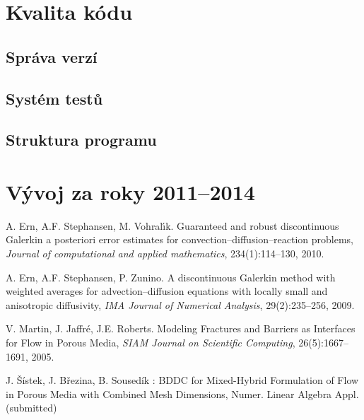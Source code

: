 \documentclass[11pt]{report}
\begin{document}
\section{Kvalita kódu}
\subsection{Správa verzí}
\subsection{Systém testů}
\subsection{Struktura programu}



\section{Vývoj za roky 2011--2014}

\begin{thebibliography}{99}

A. Ern, A.F. Stephansen, M. Vohral{\'\i}k.
Guaranteed and robust discontinuous Galerkin a posteriori error estimates for convection--diffusion--reaction problems,
\emph{Journal of computational and applied mathematics}, 234(1):114--130, 2010.


A. Ern, A.F. Stephansen, P. Zunino.
A discontinuous {G}alerkin method with weighted averages for advection--diffusion equations with locally small and anisotropic diffusivity,
\emph{IMA Journal of Numerical Analysis}, 29(2):235--256, 2009.


V. Martin, J. Jaffr{\'e}, J.E. Roberts.
Modeling Fractures and Barriers as Interfaces for Flow in Porous Media,
\emph{{SIAM} Journal on Scientific Computing}, 26(5):1667--1691, 2005.


J. Šístek, J. Březina, B. Sousedík : BDDC for Mixed-Hybrid 
Formulation of Flow in Porous Media with Combined Mesh Dimensions, Numer. Linear 
Algebra Appl. (submitted)
\end{thebibliography}
\end{document}
